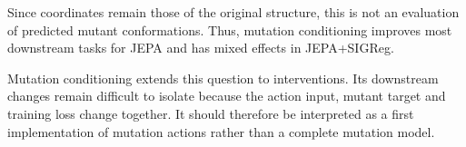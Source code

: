 \documentclass{article}
\begin{document}
Since coordinates remain those of the original structure, this is not an evaluation of predicted mutant conformations. Thus, mutation conditioning improves most downstream tasks for JEPA and has mixed effects in JEPA+SIGReg.

Mutation conditioning extends this question to interventions. Its downstream changes remain difficult to isolate because the action input, mutant target and training loss change together. It should therefore be interpreted as a first implementation of mutation actions rather than a complete mutation model.
\end{document}

